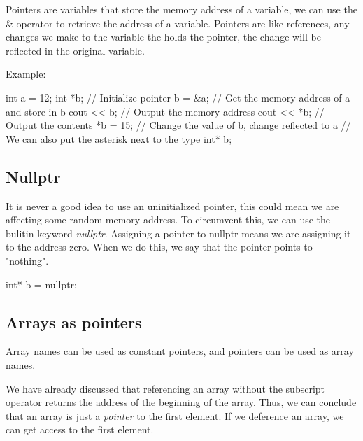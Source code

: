 \documentclass{report}
\begin{document}
    \pagebreak
    \bigbreak \noindent 
    \begin{concept}
 Pointers are variables that store the memory address of a variable, we can use the \& operator to retrieve the address of a variable. Pointers are like references, any changes we make to the variable the holds the pointer, the change will be reflected in the original variable.
	\end{concept}
    \bigbreak \noindent 
    
    \bigbreak \noindent 
    Example:
    \bigbreak \noindent 
    
    \begin{cppcode}
int a = 12;
int *b; // Initialize pointer  
b = &a; // Get the memory address of a and store in b
cout << b; // Output the memory address
cout << *b; // Output the contents
*b = 15; // Change the value of b, change reflected to a
// We can also put the asterisk next to the type
int* b;
    \end{cppcode}
    

    \bigbreak \noindent 
    \subsection{Nullptr}
    \bigbreak \noindent 
    It is never a good idea to use an uninitialized pointer, this could mean we are affecting some random memory address. To circumvent this, we can use the bulitin keyword \textit{nullptr}. Assigning a pointer to nullptr means we are assigning it to the address zero. When we do this, we say that the pointer points to "nothing".
    \bigbreak \noindent 
    
    \begin{cppcode}
int* b = nullptr;
    \end{cppcode}
    
    \bigbreak \noindent 
    
    \pagebreak
    \subsection{Arrays as pointers}
    \bigbreak \noindent 
    \begin{concept}
 Array names can be used as constant pointers, and pointers can be used as array names.
	\end{concept}
    \bigbreak \noindent 
    We have already discussed that referencing an array without the subscript operator returns the address of the beginning of the array. Thus, we can conclude that an array is just a \textit{pointer} to the first element.
    \bigbreak \noindent 
    If we deference an array, we can get access to the first element.
    \bigbreak \noindent 
    
\end{document}
